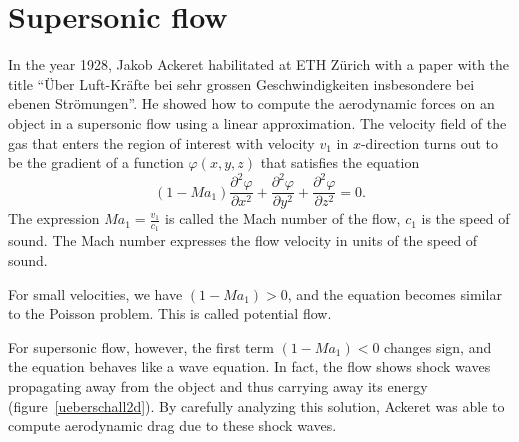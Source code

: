 %
%
%
\section{Supersonic flow}
In the year 1928, Jakob Ackeret habilitated at ETH Zürich with a 
paper with the title
``Über Luft-Kräfte bei sehr grossen
Geschwindigkeiten insbesondere bei ebenen Strömungen''.
He showed how to compute the aerodynamic forces on an object
in a supersonic flow using a linear approximation.
The velocity field of the gas that enters the region of interest with
velocity $v_1$ in $x$-direction turns out to be the gradient of
a function $\varphi(x,y,z)$ that satisfies the equation
\[
(1-\textit{Ma}_1)\frac{\partial^2\varphi}{\partial x^2}
+
\frac{\partial^2\varphi}{\partial y^2}
+
\frac{\partial^2\varphi}{\partial z^2}=0.
\]
The expression
$\textit{Ma}_1=\frac{v_1}{c_1}$ is called the Mach number of the flow,
$c_1$ is the speed of sound.
The Mach number expresses the flow velocity in units of the speed of sound.

For small velocities, we have $(1-\textit{Ma}_1)>0$, and the equation
becomes similar to the Poisson problem.
This is called potential flow.

For supersonic flow, however, the first term
$(1-\textit{Ma}_1) < 0$
changes sign, and the equation behaves like a wave equation.
In fact, the flow shows shock waves propagating away from the object
and thus carrying away its energy
(figure~\ref{ueberschall2d}).
By carefully analyzing this solution, Ackeret was able to compute
aerodynamic drag due to these shock waves.

